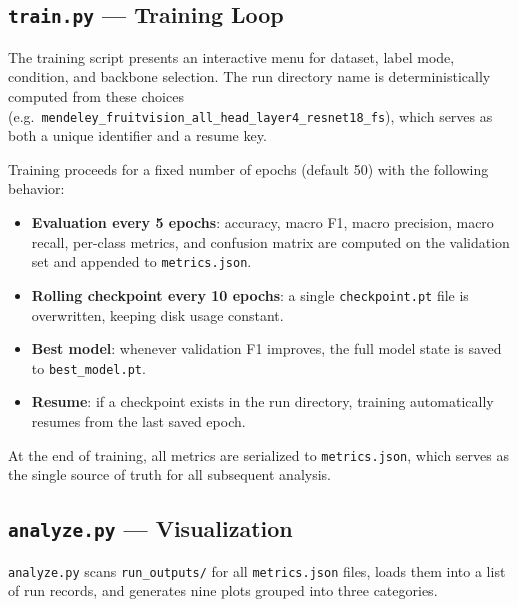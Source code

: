 \documentclass[12pt, a4paper]{article}
\begin{document}
\subsection{\texttt{train.py} --- Training Loop}

The training script presents an interactive menu for dataset, label mode,
condition, and backbone selection.
The run directory name is deterministically computed from these choices
(e.g.\ \texttt{mendeley\_fruitvision\_all\_head\_layer4\_resnet18\_fs}),
which serves as both a unique identifier and a resume key.

Training proceeds for a fixed number of epochs (default 50) with the following
behavior:
\begin{itemize}
    \item \textbf{Evaluation every 5 epochs}: accuracy, macro F1, macro
    precision, macro recall, per-class metrics, and confusion matrix are
    computed on the validation set and appended to \texttt{metrics.json}.
    \item \textbf{Rolling checkpoint every 10 epochs}: a single
    \texttt{checkpoint.pt} file is overwritten, keeping disk usage constant.
    \item \textbf{Best model}: whenever validation F1 improves, the full model
    state is saved to \texttt{best\_model.pt}.
    \item \textbf{Resume}: if a checkpoint exists in the run directory,
    training automatically resumes from the last saved epoch.
\end{itemize}
At the end of training, all metrics are serialized to
\texttt{metrics.json}, which serves as the single source of truth for all
subsequent analysis.

\subsection{\texttt{analyze.py} --- Visualization}

\texttt{analyze.py} scans \texttt{run\_outputs/} for all
\texttt{metrics.json} files, loads them into a list of run records, and
generates nine plots grouped into three categories.
\end{document}
